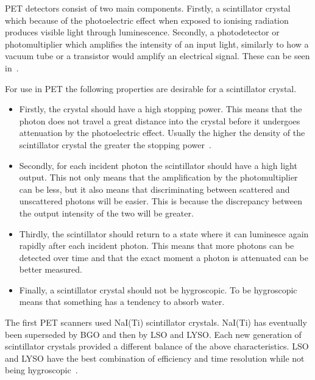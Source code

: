                 \gls{PET} detectors consist of two main components. Firstly, a scintillator crystal which because of the photoelectric effect when exposed to ionising radiation produces visible light through luminescence. Secondly, a photodetector or photomultiplier which amplifies the intensity of an input light, similarly to how a vacuum tube or a transistor would amplify an electrical signal. These can be seen in~.
                
                For use in \gls{PET} the following properties are desirable for a scintillator crystal.
                
                \begin{itemize}
                    \item Firstly, the crystal should have a high stopping power. This means that the photon does not travel a great distance into the crystal before it undergoes attenuation by the photoelectric effect. Usually the higher the density of the scintillator crystal the greater the stopping power~\parencite{Derenzo2003TheScintillator}.
                    
                    \item Secondly, for each incident photon the scintillator should have a high light output. This not only means that the amplification by the photomultiplier can be less, but it also means that discriminating between scattered and unscattered photons will be easier. This is because the discrepancy between the output intensity of the two will be greater.

                    \item Thirdly, the scintillator should return to a state where it can luminesce again rapidly after each incident photon. This means that more photons can be detected over time and that the exact moment a photon is attenuated can be better measured.
                    
                    \item Finally, a scintillator crystal should not be hygroscopic. To be hygroscopic means that something has a tendency to absorb water.
                \end{itemize}
                
                The first \gls{PET} scanners used \gls{NaI(Ti)} scintillator crystals. \gls{NaI(Ti)} has eventually been superseded by \gls{BGO} and then by \gls{LSO} and \gls{LYSO}. Each new generation of scintillator crystals provided a different balance of the above characteristics. \gls{LSO} and \gls{LYSO} have the best combination of efficiency and time resolution while not being hygroscopic~\parencite{BGOCherenkovBib, ScintilatorsBib, Mao2013CrystalCrystals}.
                
